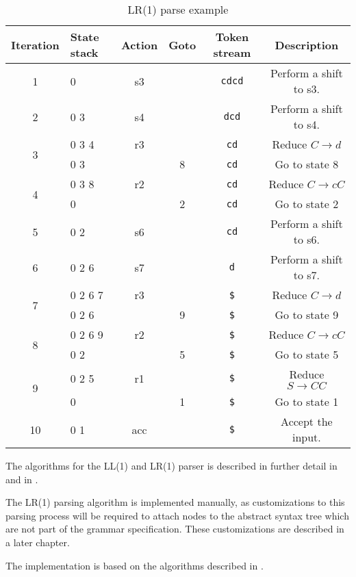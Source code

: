 \begin{table}
\centering
\begin{tabular}{c|l|c|c|c|c}
Iteration & State stack & Action & Goto & Token stream & Description\\
\hline 
1 & 0 & s3 & & \verb|cdcd| & Perform a shift to s3.\\
\hline 
2 & 0 3 & s4 & & \verb|dcd| & Perform a shift to s4.\\
\hline 
\multirow{2}{*}{3} & 0 3 4 & r3 &  & \verb|cd| & Reduce $C \rightarrow d$\\
& 0 3 & & 8 & \verb|cd| & Go to state 8\\
\hline 
\multirow{2}{*}{4} & 0 3 8 & r2 & & \verb|cd| & Reduce $C \rightarrow c C$\\
& 0 &  & 2 & \verb|cd| & Go to state 2\\
\hline 
5 & 0 2 & s6 & & \verb|cd| & Perform a shift to s6.\\
\hline 
6 & 0 2 6 & s7 & & \verb|d| & Perform a shift to s7.\\
\hline 
\multirow{2}{*}{7} & 0 2 6 7 & r3 & & \verb|$| & Reduce $C \rightarrow d$\\
& 0 2 6 &  & 9 & \verb|$| & Go to state 9\\
\hline 
\multirow{2}{*}{8} & 0 2 6 9 & r2 & & \verb|$| & Reduce $C \rightarrow c C$\\
& 0 2 &  & 5 & \verb|$| & Go to state 5\\
\hline 
\multirow{2}{*}{9} & 0 2 5 & r1 & & \verb|$| & Reduce $S \rightarrow C C$\\
& 0 &  & 1 & \verb|$| & Go to state 1\\
\hline 
10 & 0 1 & acc & & \verb|$| & Accept the input.\\
\end{tabular}
\caption{LR(1) parse example}
\label{table:lr1_parse_example}
\end{table}

The algorithms for the LL(1) and LR(1) parser is described in further detail in \cite[pages 45-67]{Appel2002-kleene} and in \cite[chapter 4 - Syntax analysis]{AhoLSU2006}.

The LR(1) parsing algorithm is implemented manually, as customizations to this parsing process will be required to attach nodes to the abstract syntax tree
which are not part of the grammar specification. These customizations are described in a later chapter.

The implementation is based on the algorithms described in \cite[Handouts 10, 11]{stanford_course}.